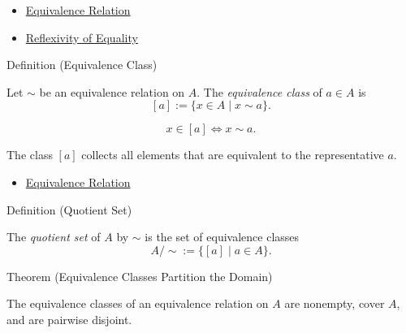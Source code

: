 \begin{dependencies}
\begin{itemize}
  \item \hyperref[def:equivalence-relation]{Equivalence Relation}
  \item \hyperref[ax:equality-reflexivity]{Reflexivity of Equality}
\end{itemize}
\end{dependencies}

\begin{definitionbox}{Definition (Equivalence Class)}
\begin{definition}
\label{def:equivalence-class}
Let $\sim$ be an equivalence relation on $A$. The \emph{equivalence class}
of $a\in A$ is
\[
[a] := \{x\in A \mid x\sim a\}.
\]
\end{definition}

\begin{remark*}
\[
x\in [a] \Longleftrightarrow x\sim a.
\]
\end{remark*}

\begin{remark*}[Interpretation]
The class $[a]$ collects all elements that are equivalent to the
representative $a$.
\end{remark*}

\begin{dependencies}
\begin{itemize}
  \item \hyperref[def:equivalence-relation]{Equivalence Relation}
\end{itemize}
\end{dependencies}
\end{definitionbox}

\begin{definitionbox}{Definition (Quotient Set)}
\begin{definition*}
The \emph{quotient set} of $A$ by $\sim$ is the set of equivalence classes
\[
A/{\sim} := \{[a]\mid a\in A\}.
\]
\end{definition*}
\end{definitionbox}

\begin{theorembox}{Theorem (Equivalence Classes Partition the Domain)}
\begin{theorem}
\label{thm:equivalence-classes-partition-domain}
The equivalence classes of an equivalence relation on $A$ are nonempty, cover
$A$, and are pairwise disjoint.
\end{theorem}
\end{theorembox}

